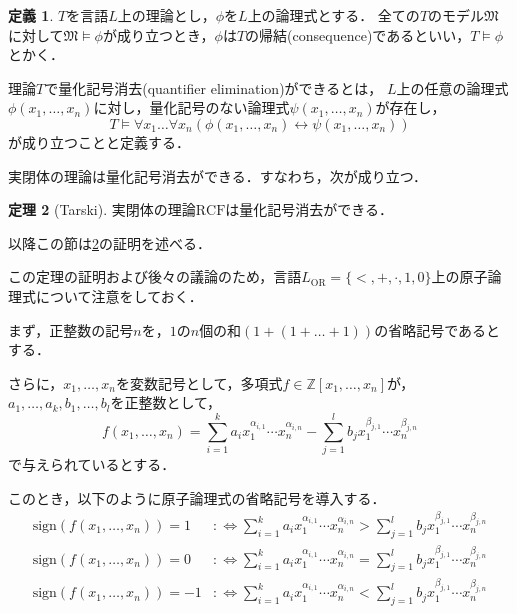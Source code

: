 \documentclass[uplatex, dvipdfmx]{jsarticle}
\numberwithin{equation}{section}
\newcommand{\Z}{\mathbb{Z}}
\newcommand{\M}{\mathfrak{M}}
\newcommand{\defiff}{ :\Leftrightarrow}
\newcommand{\RCF}{\mathrm{RCF}}
\newcommand{\sign}{\mathrm{sign}}
\theoremstyle{definition}
\newtheorem{definition}{定義}[section]
\newtheorem{theorem}[definition]{定理}
\begin{document}
\begin{definition}
$T$を言語$L$上の理論とし，$\phi$を$L$上の論理式とする．
全ての$T$のモデル$\M$に対して$\M \models \phi$が成り立つとき，$\phi$は$T$の帰結(consequence)であるといい，$T \models \phi$とかく．

理論$T$で量化記号消去(quantifier elimination)ができるとは，
$L$上の任意の論理式$\phi(x_1,\dots,x_n)$に対し，量化記号のない論理式$\psi(x_1,\dots, x_n)$が存在し，
\begin{equation}
     T \models \forall x_1 \dots \forall x_n(\phi(x_1,\dots,x_n) \leftrightarrow \psi(x_1, \dots, x_n))
\end{equation}
が成り立つことと定義する．
\end{definition}


実閉体の理論は量化記号消去ができる．すなわち，次が成り立つ．

\begin{theorem}[Tarski]\label{theorem:Tarski}
     実閉体の理論$\RCF$は量化記号消去ができる．
\end{theorem}

以降この節は\cref{theorem:Tarski}の証明を述べる．

この定理の証明および後々の議論のため，言語$L_\mathrm{OR} = \{<, +, \cdot, 1, 0\}$上の原子論理式について注意をしておく．

まず，正整数の記号$n$を，$1$の$n$個の和$(1 + (1 + \dots + 1 ))$の省略記号であるとする．

さらに，$x_1, \dots, x_n$を変数記号として，多項式$f \in \Z[x_1, \dots, x_n]$が，$a_1, \dots, a_k, b_1, \dots, b_l$を正整数として，
\begin{equation}
     f(x_1, \dots, x_n) = \sum_{i=1}^k a_i x_1^{\alpha_{i,1}} \cdots x_n^{\alpha_{i,n}} - \sum_{j=1}^l b_j x_1^{\beta_{j,1}} \cdots x_n^{\beta_{j,n}}
\end{equation}
で与えられているとする．

このとき，以下のように原子論理式の省略記号を導入する．
\begin{align}
     \sign (f(x_1, \dots, x_n)) = 1 &\defiff \sum_{i=1}^k a_i x_1^{\alpha_{i,1}} \cdots x_n^{\alpha_{i,n}} > \sum_{j=1}^l b_j x_1^{\beta_{j,1}} \cdots x_n^{\beta_{j,n}}\\
     \sign (f(x_1, \dots, x_n)) = 0 &\defiff \sum_{i=1}^k a_i x_1^{\alpha_{i,1}} \cdots x_n^{\alpha_{i,n}} = \sum_{j=1}^l b_j x_1^{\beta_{j,1}} \cdots x_n^{\beta_{j,n}}\\
     \sign (f(x_1, \dots, x_n)) = -1 &\defiff \sum_{i=1}^k a_i x_1^{\alpha_{i,1}} \cdots x_n^{\alpha_{i,n}} < \sum_{j=1}^l b_j x_1^{\beta_{j,1}} \cdots x_n^{\beta_{j,n}}
\end{align}
\end{document}
